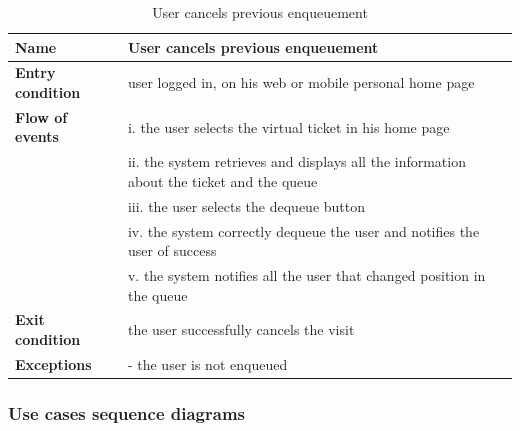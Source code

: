 \begin{table}[h!]
    \centering
    \begin{tabular}{@{}P{0.2\textwidth}P{0.70\textwidth}@{}}
        \toprule
        \textbf{Name}                 & User cancels previous enqueuement\\
        \midrule
        \textbf{Entry condition}      & user logged in, on his web or mobile personal home page\\
        \textbf{Flow of events}            
        & i. the user selects the virtual ticket in his home page\\
        & ii. the system retrieves and displays all the information about the ticket and the queue\\
        & iii. the user selects the dequeue button\\
        & iv. the system correctly dequeue the user and notifies the user of success\\
        & v. the system notifies all the user that changed position in the queue\\
        \textbf{Exit condition}       & the user successfully cancels the visit\\
        \textbf{Exceptions}           
        & - the user is not enqueued\\
        \bottomrule
    \end{tabular}
\caption{User cancels previous enqueuement}
\label{table:usercnacelspreviousenquement}
\end{table}

\clearpage

\subsubsection{Use cases sequence diagrams}


